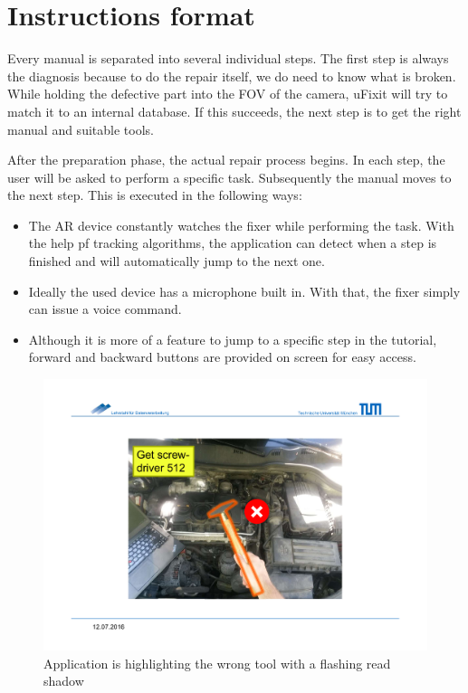 	\section{Instructions format}
	\label{sec:instr-format}
	
		Every manual is separated into several individual steps. The first step is always the diagnosis because to do the repair itself, we do need to know what is broken. While holding the defective part into the FOV of the camera, uFixit will try to match it to an internal database. If this succeeds, the next step is to get the right manual and suitable tools.
		
		
		After the preparation phase, the actual repair process begins. In each step, the user will be asked to perform a specific task. Subsequently the manual moves to the next step. This is executed in the following ways:
		
		\begin{itemize}
			\itemsep0em
			\item The AR device constantly watches the fixer while performing the task. With the help pf tracking algorithms, the application can detect when a step is finished and will automatically jump to the next one.
			\item Ideally the used device has a microphone built in. With that, the fixer simply can issue a voice command.
			\item Although it is more of a feature to jump to a specific step in the tutorial, forward and backward buttons are provided on screen for easy access.
		\end{itemize}
		
		\begin{figure}[H]
			\includegraphics[width=\textwidth, trim=4cm 3cm 4cm 4cm, clip]{../images/instr-hammer.pdf}
			\centering
			\caption{Application is highlighting the wrong tool with a flashing read shadow}
			\label{fig:instr-hammer}
		\end{figure}
		
